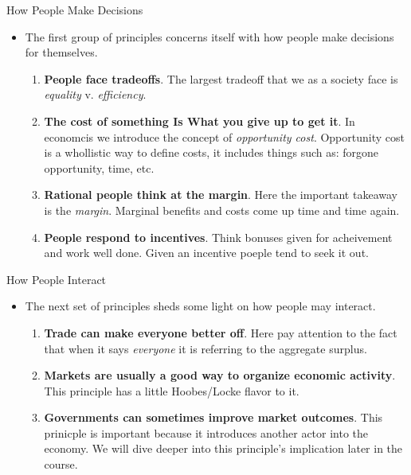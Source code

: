 \documentclass[aspectratio=169]{beamer}
\begin{document}
\begin{frame}{How People Make Decisions}
    \begin{itemize}
        \item The first group of principles concerns itself with how people make decisions for themselves.
        \begin{enumerate}
            \item \textbf{People face tradeoffs}. The largest tradeoff that we as a society face is \textit{equality} v. \textit{efficiency}.
            \item \textbf{The cost of something Is What you give up to get it}. In economcis we introduce the concept of \textit{opportunity cost}. Opportunity cost is a whollistic way to define costs, it includes things such as: forgone opportunity, time, etc.
            \item \textbf{Rational people think at the margin}. Here the important takeaway is the \textit{margin}. Marginal benefits and costs come up time and time again. 
            \item \textbf{People respond to incentives}. Think bonuses given for acheivement and work well done. Given an incentive poeple tend to seek it out.
        \end{enumerate}
    \end{itemize}
\end{frame}

\begin{frame}{How People Interact}
    \begin{itemize}
        \item The next set of principles sheds some light on how people may interact.
        \begin{enumerate}
            \item \textbf{Trade can make everyone better off}. Here pay attention to the fact that when it says \textit{everyone} it is referring to the aggregate surplus.
            \item \textbf{Markets are usually a good way to organize economic activity}. This principle has a little Hoobes/Locke flavor to it. 
            \item \textbf{Governments can sometimes improve market outcomes}. This prinicple is important because it introduces another actor into the economy. We will dive deeper into this principle's implication later in the course.
        \end{enumerate}
    \end{itemize}
\end{frame}
\end{document}
